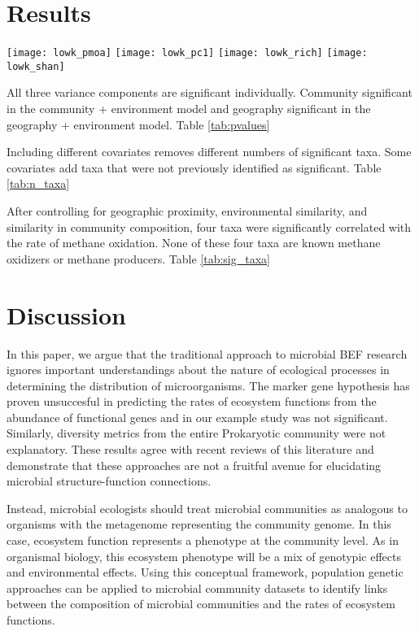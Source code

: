 \documentclass{article}
\begin{document}
\section{Results}


\texttt{[image: lowk\_pmoa]}
\texttt{[image: lowk\_pc1]}
\texttt{[image: lowk\_rich]}
\texttt{[image: lowk\_shan]}

All three variance components are significant individually. Community
significant in the community + environment model and geography
significant in the geography + environment model. Table \ref{tab:pvalues}



Including different covariates removes different numbers of
significant taxa. Some covariates add taxa that were not previously
identified as significant. Table \ref{tab:n_taxa} 



After controlling for geographic proximity, environmental similarity, and
similarity in community composition, four taxa were significantly correlated
with the rate of methane oxidation. None of these four taxa are known methane
oxidizers or methane producers. Table  \ref{tab:sig_taxa}



\section{Discussion}

In this paper, we argue that the traditional approach to microbial BEF research
ignores important understandings about the nature of ecological processes in
determining the distribution of microorganisms. The marker gene hypothesis has
proven unsuccesful in predicting the rates of ecosystem functions from the
abundance of functional genes and in our example study was not significant.
Similarly, diversity metrics from the entire Prokaryotic community were not
explanatory. These results agree with recent reviews of this literature and
demonstrate that these approaches are not a fruitful avenue for elucidating
microbial structure-function connections. 

Instead, microbial ecologists should treat microbial communities as analogous to
organisms with the metagenome representing the community genome. In this case,
ecosystem function represents a phenotype at the community level. As in
organismal biology, this ecosystem phenotype will be a mix of genotypic effects and
environmental effects. Using this conceptual framework, population genetic
approaches can be applied to microbial community datasets to identify  links
between the composition of microbial communities and the rates of ecosystem
functions.
\end{document}
